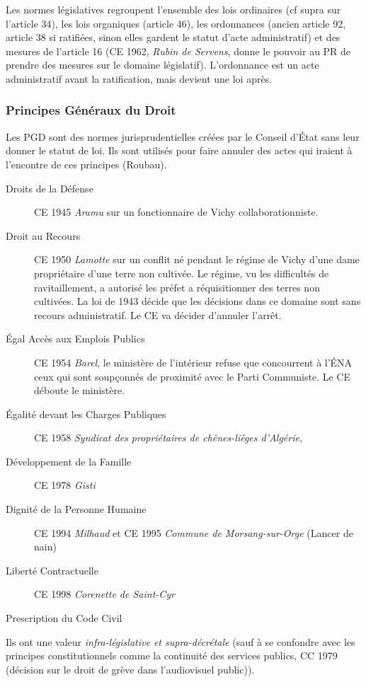 \documentclass[math]{cours}
\begin{document}
Les normes législatives regroupent l'ensemble des lois ordinaires (cf supra sur l'article 34), les lois organiques (article 46), les ordonnances (ancien article 92, article 38 si ratifiées, sinon elles gardent le statut d'acte administratif) et des mesures de l'article 16 (CE 1962, \emph{Rubin de Servens}, donne le pouvoir au PR de prendre des mesures sur le domaine législatif).
L'ordonnance est un acte administratif avant la ratification, mais devient une loi après.

\subsubsection{Principes Généraux du Droit}
Les PGD sont des normes jurisprudentielles créées par le Conseil d'État sans leur donner le statut de loi.
Ils sont utilisés pour faire annuler des actes qui iraient à l'encontre de ces principes (Roubau).
\begin{description}
	\item[Droits de la Défense] CE 1945 \emph{Aramu} sur un fonctionnaire de Vichy collaborationniste.
	\item[Droit au Recours] CE 1950 \emph{Lamotte} sur un conflit né pendant le régime de Vichy d'une dame propriétaire d'une terre non cultivée.
		Le régime, vu les difficultés de ravitaillement, a autorisé les préfet a réquisitionner des terres non cultivées.
		La loi de 1943 décide que les décisions dans ce domaine sont sans recours administratif.
		Le CE va décider d'annuler l'arrêt.
	\item[Égal Accès aux Emplois Publics] CE 1954 \emph{Barel}, le ministère de l'intérieur refuse que concourrent à l'ÉNA ceux qui sont soupçonnés de proximité avec le Parti Communiste.
		Le CE déboute le ministère.
	\item[Égalité devant les Charges Publiques] CE 1958 \emph{Syndicat des propriétaires de chênes-lièges d'Algérie},
	\item[Développement de la Famille] CE 1978 \emph{Gisti}
	\item[Dignité de la Personne Humaine] CE 1994 \emph{Milhaud} et CE 1995 \emph{Commune de Morsang-sur-Orge} (Lancer de nain)
	\item[Liberté Contractuelle] CE 1998 \emph{Corenette de Saint-Cyr}
	\item[Prescription du Code Civil]
\end{description}
Ils ont une valeur \emph{infra-législative et supra-décrétale} (sauf à se confondre avec les principes constitutionnels comme la continuité des services publics, CC 1979 (décision sur le droit de grève dans l'audiovisuel public)).
\end{document}
